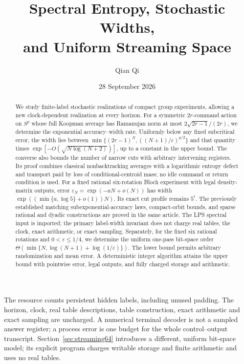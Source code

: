 \documentclass[11pt]{amsart}
\title[Spectral entropy and streaming space]{Spectral Entropy, Stochastic Widths,\\and Uniform Streaming Space}
\author{Qian Qi}
\date{28 September 2026}
\numberwithin{equation}{section}
\theoremstyle{definition}\newtheorem{definition}[theorem]{Definition}
\theoremstyle{remark}\newtheorem{remark}[theorem]{Remark}
\begin{document}
\begin{abstract}
We study finite-label stochastic realizations of compact group experiments,
allowing a new clock-dependent realization at every horizon. For a
symmetric $2r$-command action on $S^p$ whose full Koopman average has
Ramanujan norm at most $2\sqrt{2r-1}/(2r)$, we determine the exponential
accuracy--width rate. Uniformly below any fixed subcritical error,
the width lies between $\min\{(2r-1)^N,((N+1)/\varepsilon)^{p/2}\}$
and that quantity times $\exp[-O(\sqrt{N\log(N+2)})]$, up to a constant
in the upper bound. The converse also bounds the number of narrow cuts
with arbitrary intervening registers. Its proof combines classical
nonbacktracking averages with a logarithmic entropy defect and transport
paid by loss of conditional-centroid mass; no idle command or return
condition is used. For a fixed rational six-rotation Bloch experiment
with legal density-matrix outputs, error $\varepsilon_N=\exp(-aN+o(N))$
has width $\exp((\min\{a,\log5\}+o(1))N)$. Its exact cut profile remains
$5^t$. The previously established matching subexponential-accuracy laws,
compact-orbit bounds, and sparse rational and dyadic constructions are
proved in the same article. The LPS spectral input is imported; the
primary label-width invariant does not charge real tables, the clock,
exact arithmetic, or exact sampling. Separately, for the fixed six rational
rotations and $0<\varepsilon\le1/4$, we determine the uniform one-pass bit-space order
$\Theta(\min\{N,\log(N+1)+\log(1/\varepsilon)\})$. The lower
bound permits arbitrary randomization and mean error. A deterministic
integer algorithm attains the upper bound with pointwise error, legal
outputs, and fully charged storage and arithmetic.
\end{abstract}
\maketitle
\noindent The resource counts persistent hidden labels, including unused
padding. The horizon, clock, real table descriptions, table construction,
exact arithmetic and exact sampling are uncharged. A numerical terminal
decoder is not a sampled answer register; a process error is one budget
for the whole control--output transcript. Section~\ref{sec:streaming64}
introduces a different, uniform bit-space model; its explicit program
charges writable storage and finite arithmetic and uses no real tables.




















\end{document}
